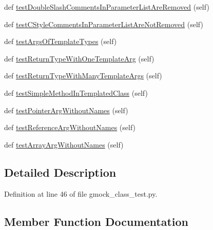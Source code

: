 \begin{DoxyCompactItemize}
\item 
def \hyperlink{classcpp_1_1gmock__class__test_1_1_generate_methods_test_abb9fce46de4ac1d2943b85e84ce14c83}{test\+Double\+Slash\+Comments\+In\+Parameter\+List\+Are\+Removed} (self)
\item 
def \hyperlink{classcpp_1_1gmock__class__test_1_1_generate_methods_test_afa44c6ac675ce7454ff0f51164bde59e}{test\+C\+Style\+Comments\+In\+Parameter\+List\+Are\+Not\+Removed} (self)
\item 
def \hyperlink{classcpp_1_1gmock__class__test_1_1_generate_methods_test_ade05313ccffe74f9eaa42fb66c14f702}{test\+Args\+Of\+Template\+Types} (self)
\item 
def \hyperlink{classcpp_1_1gmock__class__test_1_1_generate_methods_test_a747b7b1b9da071eb8e1e2b84c7ee3614}{test\+Return\+Type\+With\+One\+Template\+Arg} (self)
\item 
def \hyperlink{classcpp_1_1gmock__class__test_1_1_generate_methods_test_affdc748928d26be259345ed6a8753988}{test\+Return\+Type\+With\+Many\+Template\+Args} (self)
\item 
def \hyperlink{classcpp_1_1gmock__class__test_1_1_generate_methods_test_a964a1b55f2096edf7a6165734b1f0619}{test\+Simple\+Method\+In\+Templated\+Class} (self)
\item 
def \hyperlink{classcpp_1_1gmock__class__test_1_1_generate_methods_test_a6a2118fde4c59d2f8f402652e7aa8896}{test\+Pointer\+Arg\+Without\+Names} (self)
\item 
def \hyperlink{classcpp_1_1gmock__class__test_1_1_generate_methods_test_af82b50cc3f5daee5f6650fff1323e30c}{test\+Reference\+Arg\+Without\+Names} (self)
\item 
def \hyperlink{classcpp_1_1gmock__class__test_1_1_generate_methods_test_a544cd40e30b5dc3fbcf42385f0a54ad1}{test\+Array\+Arg\+Without\+Names} (self)
\end{DoxyCompactItemize}


\subsection{Detailed Description}


Definition at line 46 of file gmock\+\_\+class\+\_\+test.\+py.



\subsection{Member Function Documentation}

